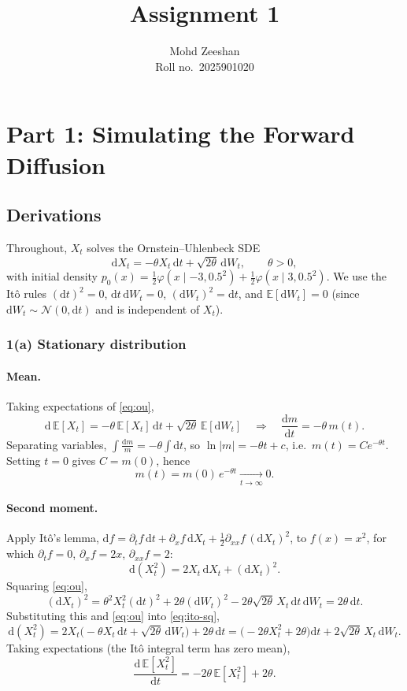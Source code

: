 \documentclass[11pt]{article}
\title{Assignment 1}
\author{Mohd Zeeshan \\ Roll no.\ 2025901020}
\date{}
\newcommand{\E}{\mathbb{E}}
\newcommand{\N}{\mathcal{N}}
\newcommand{\dd}{\mathrm{d}}
\begin{document}
\maketitle

\section*{Part 1: Simulating the Forward Diffusion}

\subsection*{Derivations}

Throughout, $X_t$ solves the Ornstein--Uhlenbeck SDE
\begin{equation}\label{eq:ou}
\dd X_t = -\theta X_t\,\dd t + \sqrt{2\theta}\,\dd W_t, \qquad \theta>0,
\end{equation}
with initial density
$p_0(x) = \tfrac12\varphi(x\mid -3,0.5^2) + \tfrac12\varphi(x\mid 3,0.5^2)$.
We use the It\^o rules $(\dd t)^2 = 0$, $\dd t\,\dd W_t = 0$, $(\dd W_t)^2 = \dd t$,
and $\E[\dd W_t]=0$ (since $\dd W_t\sim\N(0,\dd t)$ and is independent of $X_t$).

\subsubsection*{1(a) Stationary distribution}

\paragraph{Mean.} Taking expectations of \eqref{eq:ou},
\[
\dd\,\E[X_t] = -\theta\,\E[X_t]\,\dd t + \sqrt{2\theta}\,\E[\dd W_t]
\quad\Longrightarrow\quad
\frac{\dd m}{\dd t} = -\theta\, m(t).
\]
Separating variables, $\int \frac{\dd m}{m} = -\theta\int \dd t$, so
$\ln|m| = -\theta t + c$, i.e.\ $m(t) = C e^{-\theta t}$. Setting $t=0$ gives $C=m(0)$, hence
\[
m(t) = m(0)\,e^{-\theta t} \xrightarrow[t\to\infty]{} 0 .
\]

\paragraph{Second moment.} Apply It\^o's lemma,
$\dd f = \partial_t f\,\dd t + \partial_x f\,\dd X_t + \tfrac12\partial_{xx} f\,(\dd X_t)^2$,
to $f(x)=x^2$, for which $\partial_t f = 0$, $\partial_x f = 2x$, $\partial_{xx}f = 2$:
\begin{equation}\label{eq:ito-sq}
\dd(X_t^2) = 2X_t\,\dd X_t + (\dd X_t)^2 .
\end{equation}
Squaring \eqref{eq:ou},
\[
(\dd X_t)^2 = \theta^2 X_t^2 (\dd t)^2 + 2\theta(\dd W_t)^2 - 2\theta\sqrt{2\theta}\,X_t\,\dd t\,\dd W_t = 2\theta\,\dd t .
\]
Substituting this and \eqref{eq:ou} into \eqref{eq:ito-sq},
\[
\dd(X_t^2) = 2X_t\bigl(-\theta X_t\,\dd t + \sqrt{2\theta}\,\dd W_t\bigr) + 2\theta\,\dd t
= \bigl(-2\theta X_t^2 + 2\theta\bigr)\dd t + 2\sqrt{2\theta}\,X_t\,\dd W_t .
\]
Taking expectations (the It\^o integral term has zero mean),
\begin{equation}\label{eq:second}
\frac{\dd\,\E[X_t^2]}{\dd t} = -2\theta\,\E[X_t^2] + 2\theta .
\end{equation}
\end{document}
